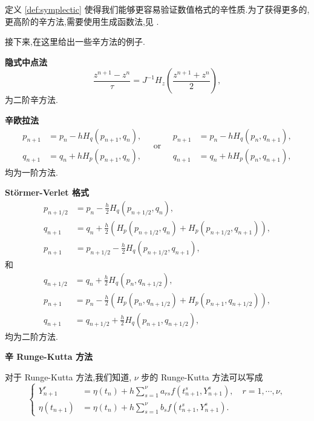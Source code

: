 \begin{remark}
{\rm 定义 \ref{def:symplectic} 使得我们能够更容易验证数值格式的辛性质.为了获得更多的,更高阶的辛方法,需要使用生成函数法,见 \cite{hairer2006geometric}.}
\end{remark}

接下来,在这里给出一些辛方法的例子.

\noindent \textbf{隐式中点法}
\begin{equation*}
\frac{z^{n+1}-z^n}{\tau}=J^{-1}H_z(\frac{z^{n+1}+z^n}{2}),
\end{equation*}
为二阶辛方法.

\noindent \textbf{辛欧拉法}
\begin{equation*}
\begin{aligned}
p_{n+1}&=p_n-hH_q(p_{n+1},q_n),\\
q_{n+1}&=q_n+hH_p(p_{n+1},q_n),
\end{aligned}
\quad \text{or} \quad
\begin{aligned}
p_{n+1}&=p_n-hH_q(p_n,q_{n+1}),\\
q_{n+1}&=q_n+hH_p(p_n,q_{n+1}),
\end{aligned}
\end{equation*}
均为一阶方法.

\noindent \textbf{St\"{o}rmer-Verlet 格式}
\begin{equation*}
\begin{aligned}
p_{n+1/2}&=p_n-\frac{h}{2}H_q(p_{n+1/2},q_n),\\
q_{n+1}&=q_n+\frac{h}{2}(H_p(p_{n+1/2},q_n)+H_p(p_{n+1/2},q_{n+1})),\\
p_{n+1}&=p_{n+1/2}-\frac{h}{2}H_q(p_{n+1/2},q_{n+1}),
\end{aligned}
\end{equation*}
和
\begin{equation*}
\begin{aligned}
q_{n+1/2}&=q_n+\frac{h}{2}H_q(p_n,q_{n+1/2}),\\
p_{n+1}&=p_n-\frac{h}{2}(H_p(p_n,q_{n+1/2})+H_p(p_{n+1},q_{n+1/2})),\\
q_{n+1}&=q_{n+1/2}+\frac{h}{2}H_q(p_{n+1},q_{n+1/2}),
\end{aligned}
\end{equation*}
均为二阶方法.

\noindent \textbf{辛 Runge-Kutta 方法}

对于 Runge-Kutta 方法,我们知道, $\nu$ 步的 Runge-Kutta 方法可以写成
\begin{equation*}
  \left\lbrace
    \begin{aligned}
      Y_{n+1}^{r}&=\eta(t_{n})+h\sum_{s=1}^{\nu}a_{rs}f(t_{n+1}^{s},Y_{n+1}^{s}),\quad r=1,\cdots, \nu, \\
      \eta(t_{n+1})&=\eta(t_{n})+h\sum_{s=1}^{\nu}b_{s}f(t_{n+1}^{s},Y_{n+1}^{s}).
    \end{aligned}
  \right.
\end{equation*}

